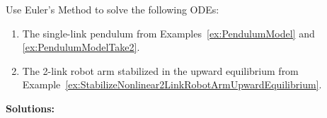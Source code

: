\bigskip

\begin{example} Use Euler's Method to solve the following ODEs:
\begin{enumerate}
\renewcommand{\labelenumi}{(\alph{enumi})}
\setlength{\itemsep}{.2cm}
\item The single-link pendulum from Examples~\ref{ex:PendulumModel} and \ref{ex:PendulumModelTake2}.

\item The 2-link robot arm stabilized in the upward equilibrium from Example~\ref{ex:StabilizeNonlinear2LinkRobotArmUpwardEquilibrium}.
\end{enumerate}
    
\end{example}

\textbf{Solutions:}

